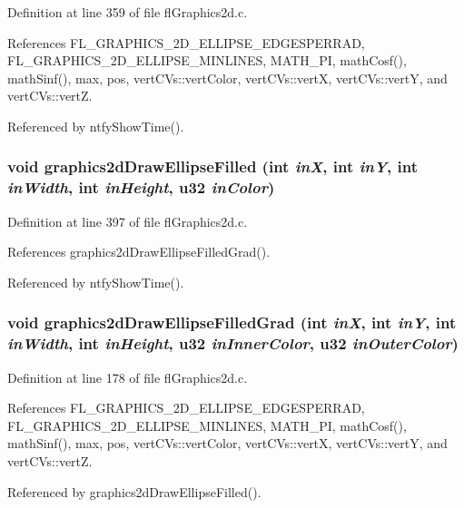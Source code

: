 Definition at line 359 of file fl\-Graphics2d.c.

References FL\_\-GRAPHICS\_\-2D\_\-ELLIPSE\_\-EDGESPERRAD, FL\_\-GRAPHICS\_\-2D\_\-ELLIPSE\_\-MINLINES, MATH\_\-PI, math\-Cosf(), math\-Sinf(), max, pos, vert\-CVs::vert\-Color, vert\-CVs::vert\-X, vert\-CVs::vert\-Y, and vert\-CVs::vert\-Z.

Referenced by ntfy\-Show\-Time().
\subsubsection{\setlength{\rightskip}{0pt plus 5cm}void graphics2d\-Draw\-Ellipse\-Filled (int {\em in\-X}, int {\em in\-Y}, int {\em in\-Width}, int {\em in\-Height}, u32 {\em in\-Color})}\label{flGraphics2d_8h_29b5a0adce9404448962b19aac6b2bc3}




Definition at line 397 of file fl\-Graphics2d.c.

References graphics2d\-Draw\-Ellipse\-Filled\-Grad().

Referenced by ntfy\-Show\-Time().
\subsubsection{\setlength{\rightskip}{0pt plus 5cm}void graphics2d\-Draw\-Ellipse\-Filled\-Grad (int {\em in\-X}, int {\em in\-Y}, int {\em in\-Width}, int {\em in\-Height}, u32 {\em in\-Inner\-Color}, u32 {\em in\-Outer\-Color})}\label{flGraphics2d_8h_2878c73198480cb1ec5413c4c6d3f0b2}




Definition at line 178 of file fl\-Graphics2d.c.

References FL\_\-GRAPHICS\_\-2D\_\-ELLIPSE\_\-EDGESPERRAD, FL\_\-GRAPHICS\_\-2D\_\-ELLIPSE\_\-MINLINES, MATH\_\-PI, math\-Cosf(), math\-Sinf(), max, pos, vert\-CVs::vert\-Color, vert\-CVs::vert\-X, vert\-CVs::vert\-Y, and vert\-CVs::vert\-Z.

Referenced by graphics2d\-Draw\-Ellipse\-Filled().
